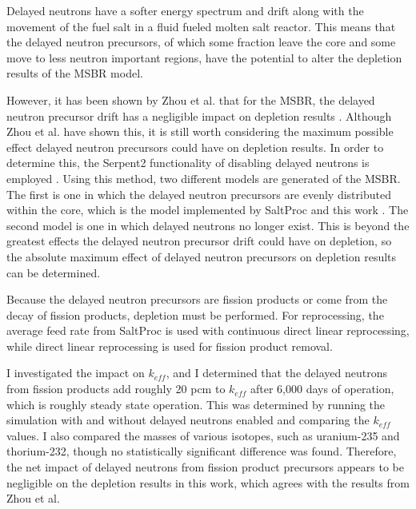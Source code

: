 Delayed neutrons have a softer energy spectrum and drift along with the movement of the fuel salt in a fluid fueled molten salt reactor. This means that the delayed neutron precursors, of which some fraction leave the core and some move to less neutron important regions, have the potential to alter the depletion results of the MSBR model.

However, it has been shown by Zhou et al. that for the MSBR, the delayed neutron precursor drift has a negligible impact on depletion results \cite{zhou_fuel_2018}. Although Zhou et al. have shown this, it is still worth considering the maximum possible effect delayed neutron precursors could have on depletion results. In order to determine this, the Serpent2 functionality of disabling delayed neutrons is employed \cite{leppanen_serpent_2015}. Using this method, two different models are generated of the MSBR. The first is one in which the delayed neutron precursors are evenly distributed within the core, which is the model implemented by SaltProc and this work \cite{rykhlevskii_modeling_2019}. The second model is one in which delayed neutrons no longer exist. This is beyond the greatest effects the delayed neutron precursor drift could have on depletion, so the absolute maximum effect of delayed neutron precursors on depletion results can be determined.

Because the delayed neutron precursors are fission products or come from the decay of fission products, depletion must be performed. For reprocessing, the average feed rate from SaltProc is used with continuous direct linear reprocessing, while direct linear reprocessing is used for fission product removal. 

I investigated the impact on $k_{eff}$, and I determined that the delayed neutrons from fission products add roughly 20 pcm to $k_{eff}$ after 6,000 days of operation, which is roughly steady state operation. 
This was determined by running the simulation with and without delayed neutrons enabled and comparing the $k_{eff}$ values.
I also compared the masses of various isotopes, such as uranium-235 and thorium-232, though no statistically significant difference was found. Therefore, the net impact of delayed neutrons from fission product precursors appears to be negligible on the depletion results in this work, which agrees with the results from Zhou et al.











